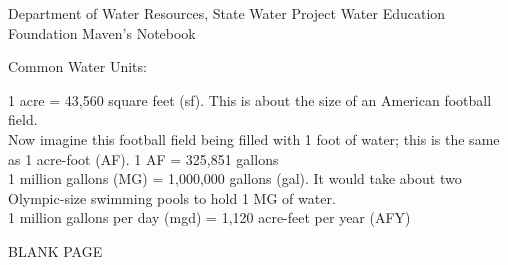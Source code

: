 \documentclass{article}
\begin{document}
Department of Water Resources, State Water Project
Water Education Foundation
Maven's Notebook




Common Water Units:

1 acre = 43,560 square feet (sf).  This is about the size of an American football field. \\

Now imagine this football field being filled with 1 foot of water; this is the same as 1 acre-foot (AF).   1 AF = 325,851 gallons\\

1 million gallons (MG) = 1,000,000 gallons (gal).  It would take about two Olympic-size swimming pools to hold 1 MG of water.\\

1 million gallons per day (mgd) = 1,120 acre-feet per year (AFY)\\



\phantom{AAA}
\vspace{10cm}
\begin{center}
BLANK PAGE
\end{center}
\end{document}
